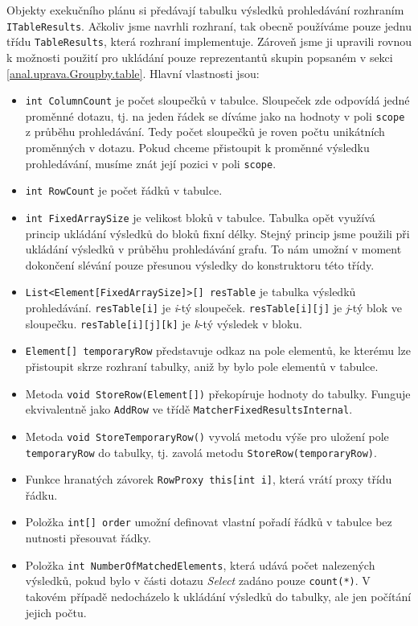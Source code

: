 Objekty exekučního plánu si předávají tabulku výsledků prohledávání rozhraním \texttt{ITableResults}.
Ačkoliv jsme navrhli rozhraní, tak obecně používáme pouze jednu třídu \texttt{TableResults}, která rozhraní implementuje.
Zároveň jsme ji upravili rovnou k možnosti použití pro ukládání pouze reprezentantů skupin popsaném v sekci \ref{anal.uprava.Groupby.table}.
Hlavní vlastnosti jsou:
\begin{itemize}
\item \texttt{int ColumnCount} je počet sloupečků v tabulce.
Sloupeček zde odpovídá jedné proměnné dotazu, tj. na jeden řádek se díváme jako na hodnoty v poli \texttt{scope} z průběhu prohledávání.
Tedy počet sloupečků je roven počtu unikátních proměnných v dotazu.
Pokud chceme přistoupit k proměnné výsledku prohledávání, musíme znát její pozici v poli \texttt{scope}.

\item \texttt{int RowCount} je počet řádků v tabulce.
\item \texttt{int FixedArraySize} je velikost bloků v tabulce.
Tabulka opět využívá princip ukládání výsledků do bloků fixní délky.
Stejný princip jsme použili při ukládání výsledků v průběhu prohledávání grafu.
To nám umožní v moment dokončení slévání pouze přesunou výsledky do konstruktoru této třídy.
\item \texttt{List<Element[FixedArraySize]>[] resTable} je tabulka výsledků prohledávání.
\texttt{resTable[i]} je \textit{i}-tý sloupeček.
\texttt{resTable[i][j]} je \textit{j}-tý blok ve sloupečku.
\texttt{resTable[i][j][k]} je \textit{k}-tý výsledek v bloku.
\item \texttt{Element[] temporaryRow} představuje odkaz na pole elementů, ke kterému lze přistoupit skrze rozhraní tabulky, aniž by bylo pole elementů v tabulce.
\item Metoda \texttt{void StoreRow(Element[])} překopíruje hodnoty do tabulky. Funguje ekvivalentně jako \texttt{AddRow} ve třídě \texttt{MatcherFixedResultsInternal}.
\item Metoda \texttt{void StoreTemporaryRow()} vyvolá metodu výše pro uložení pole \texttt{temporaryRow} do tabulky, tj. zavolá metodu \texttt{StoreRow(temporaryRow)}.
\item Funkce hranatých závorek \texttt{RowProxy this[int i]}, která vrátí proxy třídu řádku.
\item Položka \texttt{int[] order} umožní definovat vlastní pořadí řádků v tabulce bez nutnosti přesouvat řádky.
\item Položka \texttt{int NumberOfMatchedElements}, která udává počet nalezených výsledků, pokud bylo v části dotazu \textit{Select} zadáno pouze \texttt{count(*)}.
V takovém případě nedocházelo k ukládání výsledků do tabulky, ale jen počítání jejich počtu.

\end{itemize}
